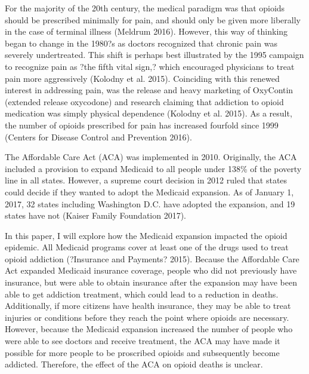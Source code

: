 \documentclass{article}
\begin{document}
For the majority of the 20th century, the medical paradigm was that opioids should be prescribed minimally for pain, and should only be given more liberally in the case of terminal illness (Meldrum 2016).  However, this way of thinking began to change in the 1980?s as doctors recognized that chronic pain was severely undertreated.  This shift is perhaps best illustrated by the 1995 campaign to recognize pain as ?the fifth vital sign,? which encouraged physicians to treat pain more aggressively (Kolodny et al. 2015).  Coinciding with this renewed interest in addressing pain, was the release and heavy marketing of OxyContin (extended release oxycodone) and research claiming that addiction to opioid medication was simply physical dependence (Kolodny et al. 2015).  As a result, the number of opioids prescribed for pain has increased fourfold since 1999 (Centers for Disease Control and Prevention 2016).   

The Affordable Care Act (ACA) was implemented in 2010. Originally, the ACA included a provision to expand Medicaid to all people under 138\% of the poverty line in all states.  However, a supreme court decision in 2012 ruled that states could decide if they wanted to adopt the Medicaid expansion.  As of January 1, 2017, 32 states including Washington D.C. have adopted the expansion, and 19 states have not (Kaiser Family Foundation 2017).  

In this paper, I will explore how the Medicaid expansion impacted the opioid epidemic.  All Medicaid programs cover at least one of the drugs used to treat opioid addiction (?Insurance and Payments? 2015).  Because the Affordable Care Act expanded Medicaid insurance coverage, people who did not previously have insurance, but were able to obtain insurance after the expansion may have been able to get addiction treatment, which could lead to a reduction in deaths.  Additionally, if more citizens have health insurance, they may be able to treat injuries or conditions before they reach the point where opioids are necessary.  However, because the Medicaid expansion increased the number of people who were able to see doctors and receive treatment, the ACA may have made it possible for more people to be proscribed opioids and subsequently become addicted.  Therefore, the effect of the ACA on opioid deaths is unclear.
\end{document}
